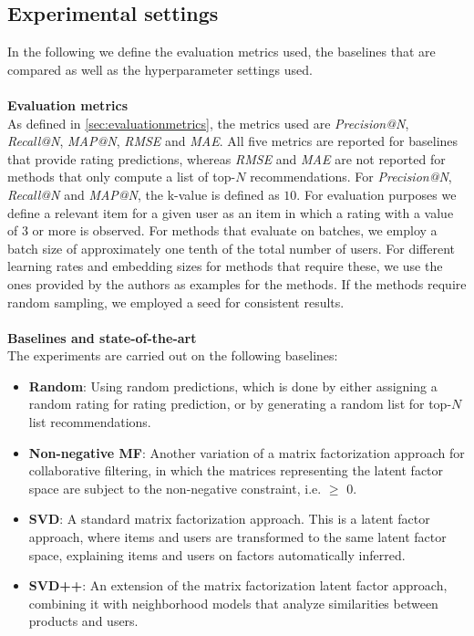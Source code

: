 \subsection{Experimental settings}
In the following we define the evaluation metrics used, the baselines that are compared as well as the hyperparameter settings used.
\\\\
\textbf{Evaluation metrics}\\
As defined in \autoref{sec:evaluationmetrics}, the metrics used are \textit{Precision@N}, \textit{Recall@N}, \textit{MAP@N}, \textit{RMSE} and \textit{MAE}.
All five metrics are reported for baselines that provide rating predictions, whereas \textit{RMSE} and \textit{MAE} are not reported for methods that only compute a list of top-$N$ recommendations.
For \textit{Precision@N}, \textit{Recall@N} and \textit{MAP@N}, the k-value is defined as $10$.
For evaluation purposes we define a relevant item for a given user as an item in which a rating with a value of $3$ or more is observed.
For methods that evaluate on batches, we employ a batch size of approximately one tenth of the total number of users.
For different learning rates and embedding sizes for methods that require these, we use the ones provided by the authors as examples for the methods. 
If the methods require random sampling, we employed a seed for consistent results.
\\\\
\textbf{Baselines and state-of-the-art}\\
The experiments are carried out on the following baselines:
\begin{itemize}
    \item \textbf{Random}: Using random predictions, which is done by either assigning a random rating for rating prediction, or by generating a random list for top-$N$ list recommendations.
    \item \textbf{Non-negative MF}: Another variation of a matrix factorization approach for collaborative filtering, in which the matrices representing the latent factor space are subject to the non-negative constraint, i.e. $\geq$ 0.
    \item \textbf{SVD}: A standard matrix factorization approach. This is a latent factor approach, where items and users are transformed to the same latent factor space, explaining items and users on factors automatically inferred.
    \item \textbf{SVD++}: An extension of the matrix factorization latent factor approach, combining it with neighborhood models that analyze similarities between products and users.
\end{itemize}

